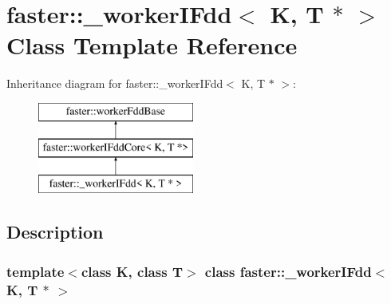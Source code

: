 \hypertarget{classfaster_1_1__workerIFdd_3_01K_00_01T_01_5_01_4}{}\section{faster\+:\+:\+\_\+worker\+I\+Fdd$<$ K, T $\ast$ $>$ Class Template Reference}
\label{classfaster_1_1__workerIFdd_3_01K_00_01T_01_5_01_4}
Inheritance diagram for faster\+:\+:\+\_\+worker\+I\+Fdd$<$ K, T $\ast$ $>$\+:\begin{figure}[H]
\begin{center}
\leavevmode
\includegraphics[height=3.000000cm]{classfaster_1_1__workerIFdd_3_01K_00_01T_01_5_01_4}
\end{center}
\end{figure}


\subsection{Description}
\subsubsection*{template$<$class K, class T$>$\newline
class faster\+::\+\_\+worker\+I\+Fdd$<$ K, T $\ast$ $>$}

